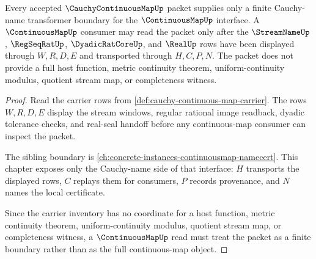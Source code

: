 \begin{theorem}
\label{thm:cauchy-continuous-map-continuousmap-boundary}
Every accepted $\CauchyContinuousMapUp$ packet supplies only a finite Cauchy-name transformer boundary for the $\ContinuousMapUp$ interface. A $\ContinuousMapUp$ consumer may read the packet only after the $\StreamNameUp$, $\RegSeqRatUp$, $\DyadicRatCoreUp$, and $\RealUp$ rows have been displayed through $W,R,D,E$ and transported through $H,C,P,N$. The packet does not provide a full host function, metric continuity theorem, uniform-continuity modulus, quotient stream map, or completeness witness.
\end{theorem}
\begin{proof}
Read the carrier rows from \autoref{def:cauchy-continuous-map-carrier}. The rows $W,R,D,E$ display the stream windows, regular rational image readback, dyadic tolerance checks, and real-seal handoff before any continuous-map consumer can inspect the packet.

The sibling boundary is \autoref{ch:concrete-instances-continuousmap-namecert}. This chapter exposes only the Cauchy-name side of that interface: $H$ transports the displayed rows, $C$ replays them for consumers, $P$ records provenance, and $N$ names the local certificate.

Since the carrier inventory has no coordinate for a host function, metric continuity theorem, uniform-continuity modulus, quotient stream map, or completeness witness, a $\ContinuousMapUp$ read must treat the packet as a finite boundary rather than as the full continuous-map object.
\end{proof}

